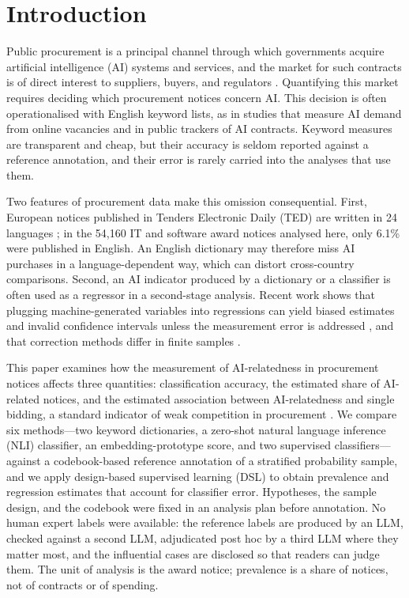 \documentclass[runningheads]{llncs}
\begin{document}
\section{Introduction}
Public procurement is a principal channel through which governments acquire artificial intelligence (AI) systems and services, and the market for such contracts is of direct interest to suppliers, buyers, and regulators \cite{hickok2022}. Quantifying this market requires deciding which procurement notices concern AI. This decision is often operationalised with English keyword lists, as in studies that measure AI demand from online vacancies \cite{acemoglu2022,babina2024} and in public trackers of AI contracts. Keyword measures are transparent and cheap, but their accuracy is seldom reported against a reference annotation, and their error is rarely carried into the analyses that use them.

Two features of procurement data make this omission consequential. First, European notices published in Tenders Electronic Daily (TED) are written in 24 languages \cite{ahmia2018}; in the 54,160 IT and software award notices analysed here, only 6.1\% were published in English. An English dictionary may therefore miss AI purchases in a language-dependent way, which can distort cross-country comparisons. Second, an AI indicator produced by a dictionary or a classifier is often used as a regressor in a second-stage analysis. Recent work shows that plugging machine-generated variables into regressions can yield biased estimates and invalid confidence intervals unless the measurement error is addressed \cite{battaglia2025,egami2023}, and that correction methods differ in finite samples \cite{audinet2025}.

This paper examines how the measurement of AI-relatedness in procurement notices affects three quantities: classification accuracy, the estimated share of AI-related notices, and the estimated association between AI-relatedness and single bidding, a standard indicator of weak competition in procurement \cite{fazekas2016}. We compare six methods---two keyword dictionaries, a zero-shot natural language inference (NLI) classifier, an embedding-prototype score, and two supervised classifiers---against a codebook-based reference annotation of a stratified probability sample, and we apply design-based supervised learning (DSL) \cite{egami2023} to obtain prevalence and regression estimates that account for classifier error. Hypotheses, the sample design, and the codebook were fixed in an analysis plan before annotation. No human expert labels were available: the reference labels are produced by an LLM, checked against a second LLM, adjudicated post hoc by a third LLM where they matter most, and the influential cases are disclosed so that readers can judge them. The unit of analysis is the award notice; prevalence is a share of notices, not of contracts or of spending.
\end{document}
